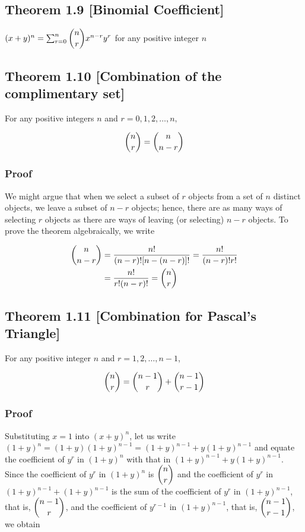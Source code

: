 \documentclass{article}
\begin{document}
\subsection*{Theorem 1.9 [Binomial Coefficient]} \((x+y)^n=\sum^n_{r=0} \dbinom n r x^{n-r} y ^r\) for any positive integer \(n\)

\subsection*{Theorem 1.10 [Combination of the complimentary set]} For any positive integers \(n\) and \(r=0,1,2,\ldots,n,\)

\[\dbinom n r = \dbinom n {n-r}\]

\subsubsection*{Proof} We might argue that when we select a subset of \(r\) objects from a set of \(n\) distinct objects, we leave a subset of \(n-r\) objects; hence, there are as many ways of selecting \(r\) objects as there are ways of leaving (or selecting) \(n-r\) objects. To prove the theorem algebraically, we write

\begin{align*}
\dbinom n {n-r} &= \frac{n!}{(n-r)![n-(n-r)]!} = \frac{n!}{(n-r)!r!}\\
&= \frac{n!}{r!(n-r)!} = \dbinom n r
\end{align*}

\subsection*{Theorem 1.11 [Combination for Pascal's Triangle]} For any positive integer \(n\) and \(r=1,2,\ldots, n-1\),

\[\dbinom n r = \dbinom {n-1} r + \dbinom {n-1} {r-1}\]

\subsubsection*{Proof} Substituting \(x=1\) into \((x+y)^n\), let us write \((1+y)^n = (1+y)(1+y)^{n-1}=(1+y)^{n-1}+y(1+y)^{n-1}\) and equate the coefficient of \(y^r\) in \((1+y)^{n}\) with that in \((1+y)^{n-1}+y(1+y)^{n-1}\). Since the coefficient of \(y^r\) in \((1+y)^{n}\) is \(\dbinom n r \) and the coefficient of \(y^r\) in \((1+y)^{n-1}+(1+y)^{n-1}\) is the sum of the coefficient of \(y^r\) in \((1+y)^{n-1}\), that is, \(\dbinom {n-1} r\), and the coefficient of \(y^{r-1}\) in \((1+y)^{n-1}\), that is, \(\dbinom {n-1} {r-1} \), we obtain 
\end{document}
